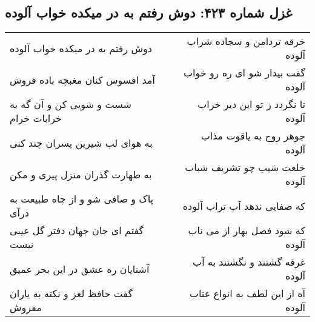 \begin{center}
\section*{غزل شماره ۴۲۳: دوش رفتم به در میکده خواب آلوده}
\label{sec:sh423}
\begin{longtable}{l p{0.5cm} r}
دوش رفتم به در میکده خواب آلوده
&&
خرقه تردامن و سجاده شراب آلوده
\\
آمد افسوس کنان مغبچه باده فروش
&&
گفت بیدار شو ای ره رو خواب آلوده
\\
شست و شویی کن و آن گه به خرابات خرام
&&
تا نگردد ز تو این دیر خراب آلوده
\\
به هوای لب شیرین پسران چند کنی
&&
جوهر روح به یاقوت مذاب آلوده
\\
به طهارت گذران منزل پیری و مکن
&&
خلعت شیب چو تشریف شباب آلوده
\\
پاک و صافی شو و از چاه طبیعت به درآی
&&
که صفایی ندهد آب تراب آلوده
\\
گفتم ای جان جهان دفتر گل عیبی نیست
&&
که شود فصل بهار از می ناب آلوده
\\
آشنایان ره عشق در این بحر عمیق
&&
غرقه گشتند و نگشتند به آب آلوده
\\
گفت حافظ لغز و نکته به یاران مفروش
&&
آه از این لطف به انواع عتاب آلوده
\\
\end{longtable}
\end{center}

